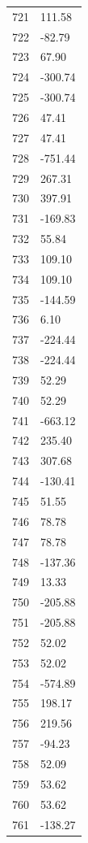 \documentclass[a4paper,11pt]{article}
\begin{document}
\begin{center}
\begin{longtable}{|R{1.5cm}|R{2.5cm}|}
  721 &       111.58 \\
  722 &       -82.79 \\
  723 &        67.90 \\
  724 &      -300.74 \\
  725 &      -300.74 \\
  726 &        47.41 \\
  727 &        47.41 \\
  728 &      -751.44 \\
  729 &       267.31 \\
  730 &       397.91 \\
  731 &      -169.83 \\
  732 &        55.84 \\
  733 &       109.10 \\
  734 &       109.10 \\
  735 &      -144.59 \\
  736 &         6.10 \\
  737 &      -224.44 \\
  738 &      -224.44 \\
  739 &        52.29 \\
  740 &        52.29 \\
  741 &      -663.12 \\
  742 &       235.40 \\
  743 &       307.68 \\
  744 &      -130.41 \\
  745 &        51.55 \\
  746 &        78.78 \\
  747 &        78.78 \\
  748 &      -137.36 \\
  749 &        13.33 \\
  750 &      -205.88 \\
  751 &      -205.88 \\
  752 &        52.02 \\
  753 &        52.02 \\
  754 &      -574.89 \\
  755 &       198.17 \\
  756 &       219.56 \\
  757 &       -94.23 \\
  758 &        52.09 \\
  759 &        53.62 \\
  760 &        53.62 \\
  761 &      -138.27 \\

\end{longtable}
\end{center}
\end{document}
